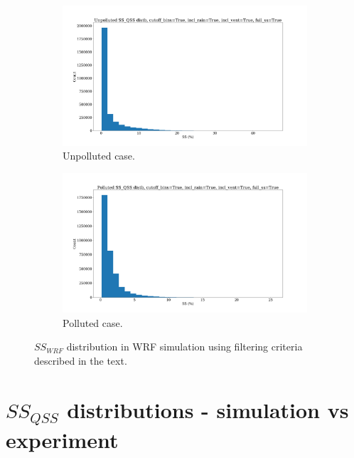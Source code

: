 \documentclass{article}
\begin{document}
\begin{figure}[ht]
	\centering
	\begin{subfigure}{0.7\textwidth}
		\includegraphics[width=\textwidth]{revmywrf/v12_ss_qss_hist_Unpolluted_figure.png}
		\caption{Unpolluted case.}
		\label{wrfssqsshistunpoll}
	\end{subfigure}
	\begin{subfigure}{0.7\textwidth}
		\includegraphics[width=\textwidth]{revmywrf/v12_ss_qss_hist_Polluted_figure.png}
		\caption{Polluted case.}
		\label{wrfssqsshistpoll}
	\end{subfigure}
	\caption{$SS_{WRF}$ distribution in WRF simulation using filtering criteria described in the text.}
	\label{wrfssqsshist}
\end{figure}

\clearpage
\newpage

\section{$SS_{QSS}$ distributions - simulation vs experiment}
\end{document}
